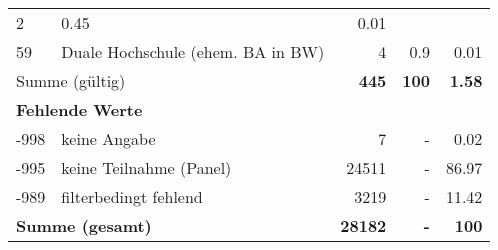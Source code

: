 \begin{longtable}{lXrrr}
       \num{2} &
       \num[round-mode=places,round-precision=2]{0.45} &
         \num[round-mode=places,round-precision=2]{0.01} \\

     59 &
     \multicolumn{1}{X}{ Duale Hochschule (ehem. BA in BW)   } &


       \num{4} &
       \num[round-mode=places,round-precision=2]{0.9} &
         \num[round-mode=places,round-precision=2]{0.01} \\
     \midrule
     \multicolumn{2}{l}{Summe (gültig)} &
       \textbf{\num{445}} &
     \textbf{100} &
       \textbf{\num[round-mode=places,round-precision=2]{1.58}} \\
     \multicolumn{5}{l}{\textbf{Fehlende Werte}}\\
       -998 &
       keine Angabe &
         \num{7} &
        - &
         \num[round-mode=places,round-precision=2]{0.02} \\
       -995 &
       keine Teilnahme (Panel) &
         \num{24511} &
        - &
         \num[round-mode=places,round-precision=2]{86.97} \\
       -989 &
       filterbedingt fehlend &
         \num{3219} &
        - &
         \num[round-mode=places,round-precision=2]{11.42} \\
     \midrule
     \multicolumn{2}{l}{\textbf{Summe (gesamt)}} &
          \textbf{\num{28182}} &
        \textbf{-} &
        \textbf{100} \\
     \bottomrule
     \end{longtable}
     
